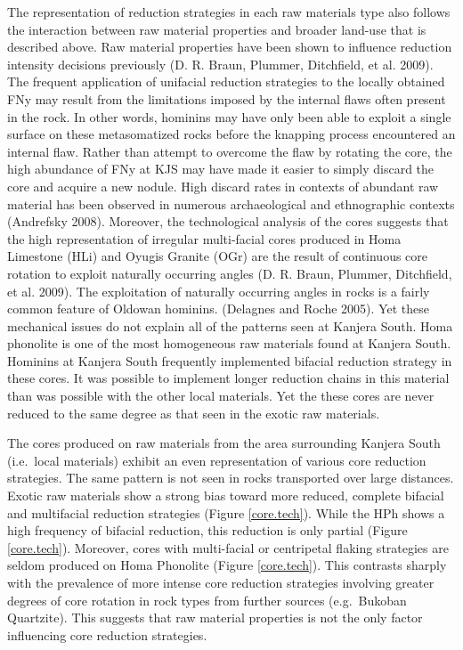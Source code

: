 \documentclass[]{elsarticle} %
\begin{document}
The representation of reduction strategies in each raw materials type
also follows the interaction between raw material properties and broader
land-use that is described above. Raw material properties have been
shown to influence reduction intensity decisions previously (D. R.
Braun, Plummer, Ditchfield, et al. 2009). The frequent application of
unifacial reduction strategies to the locally obtained FNy may result
from the limitations imposed by the internal flaws often present in the
rock. In other words, hominins may have only been able to exploit a
single surface on these metasomatized rocks before the knapping process
encountered an internal flaw. Rather than attempt to overcome the flaw
by rotating the core, the high abundance of FNy at KJS may have made it
easier to simply discard the core and acquire a new nodule. High discard
rates in contexts of abundant raw material has been observed in numerous
archaeological and ethnographic contexts (Andrefsky 2008). Moreover, the
technological analysis of the cores suggests that the high
representation of irregular multi-facial cores produced in Homa
Limestone (HLi) and Oyugis Granite (OGr) are the result of continuous
core rotation to exploit naturally occurring angles (D. R. Braun,
Plummer, Ditchfield, et al. 2009). The exploitation of naturally
occurring angles in rocks is a fairly common feature of Oldowan
hominins. (Delagnes and Roche 2005). Yet these mechanical issues do not
explain all of the patterns seen at Kanjera South. Homa phonolite is one
of the most homogeneous raw materials found at Kanjera South. Hominins
at Kanjera South frequently implemented bifacial reduction strategy in
these cores. It was possible to implement longer reduction chains in
this material than was possible with the other local materials. Yet the
these cores are never reduced to the same degree as that seen in the
exotic raw materials.

The cores produced on raw materials from the area surrounding Kanjera
South (i.e.~local materials) exhibit an even representation of various
core reduction strategies. The same pattern is not seen in rocks
transported over large distances. Exotic raw materials show a strong
bias toward more reduced, complete bifacial and multifacial reduction
strategies (Figure \ref{core.tech}). While the HPh shows a high
frequency of bifacial reduction, this reduction is only partial (Figure
\ref{core.tech}). Moreover, cores with multi-facial or centripetal
flaking strategies are seldom produced on Homa Phonolite (Figure
\ref{core.tech}). This contrasts sharply with the prevalence of more
intense core reduction strategies involving greater degrees of core
rotation in rock types from further sources (e.g.~Bukoban Quartzite).
This suggests that raw material properties is not the only factor
influencing core reduction strategies.
\end{document}
